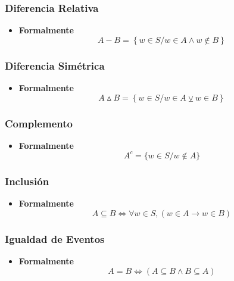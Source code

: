 \subsubsection{Diferencia Relativa}
\begin{itemize}
\item \textbf{Formalmente}
$$A-B = \left\lbrace w\in S / w\in A \wedge w\notin B\right\rbrace $$
\end{itemize}
\subsubsection{Diferencia Simétrica
}\begin{itemize}
\item \textbf{Formalmente}
$$A\vartriangle B = \left\lbrace w\in S / w\in A \veebar w\in B\right\rbrace $$
\end{itemize}
\subsubsection{Complemento}
\begin{itemize}
\item \textbf{Formalmente}
$$A^c = \{ w\in S/w\notin A \}$$
\end{itemize}
\subsubsection{Inclusión}
\begin{itemize}
\item \textbf{Formalmente}
$$A\subseteq B \Leftrightarrow \forall w \in S, (w\in A \rightarrow w\in B)$$
\end{itemize}
\subsubsection{Igualdad de Eventos}
\begin{itemize}
\item \textbf{Formalmente}
$$A=B \Leftrightarrow (A\subseteq B \wedge B\subseteq A)$$
\end{itemize}

